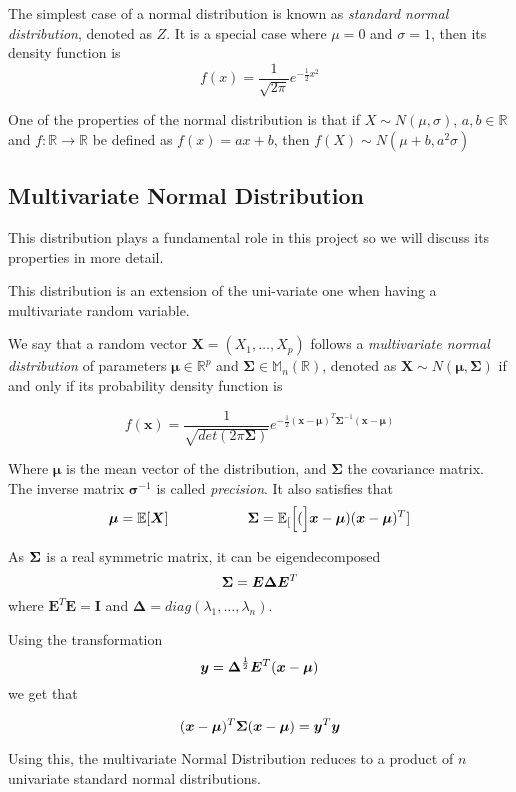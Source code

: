 The simplest case of a normal distribution is known as \emph{standard normal
  distribution}, denoted as \(Z\). It is a special case where \(\mu = 0\) and \(\sigma = 1\), then
its density function is
\[
  f(x) = \frac{1}{\sqrt{2\pi}}e^{-\frac{1}{2}x^2}
\]

One of the properties of the normal distribution is that if \(X \sim N(\mu, \sigma)\), \(a,b \in \mathbb{R}\) and \(f:\mathbb{R} \to \mathbb{R}\) be defined
as \(f(x) = ax + b\), then \(f(X) \sim N(\mu + b, a^2 \sigma)\)

\subsection{Multivariate Normal Distribution}

This distribution plays a fundamental role in this project so we will discuss
its properties in more detail.

This distribution is an extension of the uni-variate one when having a
multivariate random variable.

\begin{definition}
We say that a random vector \(\bm{X} = (X_1,\dots,X_p)\) follows a \emph{multivariate normal
  distribution} of parameters \(\bm{\mu} \in \mathbb{R}^p\) and \(\bm{\Sigma}
\in \mathbb{M}_n(\mathbb{R})\), denoted as \(\bm{X} \sim N(\bm{\mu},
\bm{\Sigma})\) if and only if its probability density function is

\[
  f(\bm{x}) = \frac{1}{\sqrt{det(2\pi \bm{\Sigma})}}e^{-\frac{1}{2}(\bm{x} - \bm{\mu})^T\bm{\Sigma}^{-1}(\bm{x}-\bm{\mu})}
\]

Where \(\bm{\mu}\) is the mean vector of the distribution, and \(\bm{\Sigma}\)
the covariance matrix. The inverse matrix \(\bm{\sigma}^{-1}\) is called \emph{precision}.
It also satisfies that
\[
\bm{\mu} = \mathbb{E}[\bm{X}] \hspace{2cm} \bm{\Sigma} = \mathbb{E}_{[}\Big[(\Big]\bm{x} - \bm{\mu})(\bm{x} - \bm{\mu})^T]
\]

As \(\bm{\Sigma}\) is a real symmetric matrix, it can be eigendecomposed
\[
  \bm{\Sigma} = \bm{E}\bm{\Delta}\bm{E}^T
\]
where \(\bm{E}^T\bm{E} = \bm{I}\) and \(\bm{\Delta} =
diag(\lambda_1,\dots,\lambda_n)\).

Using the transformation
\[
  \bm{y} = \bm{\Delta}^{\frac{1}{2}}\bm{E}^T(\bm{x} - \bm{\mu})
\]
we get that

\[
  (\bm{x} - \bm{\mu})^T\bm{\Sigma}(\bm{x} - \bm{\mu}) = \bm{y}^T\bm{y}
\]

Using this, the multivariate Normal Distribution reduces to a product of \(n\)
univariate standard normal distributions.

\end{definition}

